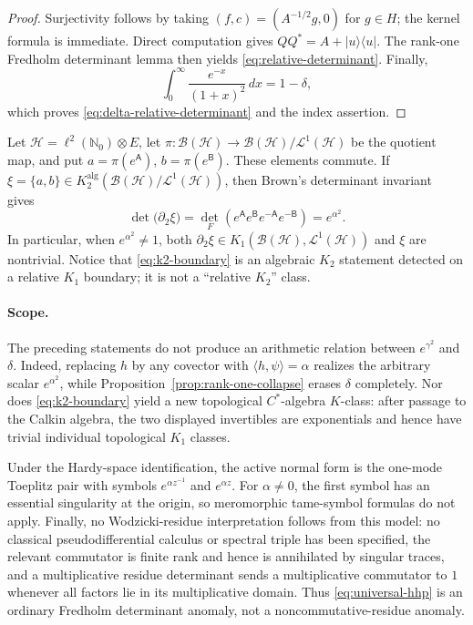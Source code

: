 \documentclass[11pt]{article}
\theoremstyle{definition}
\theoremstyle{remark}
\begin{document}
\begin{proof}
Surjectivity follows by taking $(f,c)=(A^{-1/2}g,0)$ for $g\in H$;
the kernel formula is immediate.  Direct computation gives
$QQ^*=A+|u\rangle\langle u|$.  The rank-one Fredholm determinant lemma
then yields \eqref{eq:relative-determinant}.  Finally,
\[
 \int_0^\infty\frac{e^{-x}}{(1+x)^2}\,dx=1-\delta,
\]
which proves \eqref{eq:delta-relative-determinant} and the index assertion.
\end{proof}

Let $\mathscr H=\ell^2(\mathbb N_0)\otimes E$, let
$\pi:\mathcal B(\mathscr H)\to
\mathcal B(\mathscr H)/\mathcal L^1(\mathscr H)$ be the quotient map, and
put $a=\pi(e^{\mathsf A})$, $b=\pi(e^{\mathsf B})$.  These elements commute.
If $\xi=\{a,b\}\in
K_2^{\mathrm{alg}}(\mathcal B(\mathscr H)/\mathcal L^1(\mathscr H))$, then
Brown's determinant invariant gives~\cite{Migler2017,Kaad2011}
\begin{equation}\label{eq:k2-boundary}
 \det\bigl(\partial_2\xi\bigr)
 =\det_F(e^{\mathsf A}e^{\mathsf B}
          e^{-\mathsf A}e^{-\mathsf B})
 =e^{\alpha^2}.
\end{equation}
In particular, when $e^{\alpha^2}\ne1$, both
$\partial_2\xi\in
K_1(\mathcal B(\mathscr H),\mathcal L^1(\mathscr H))$ and $\xi$ are
nontrivial.  Notice that \eqref{eq:k2-boundary} is an algebraic
$K_2$ statement detected on a relative $K_1$ boundary; it is not a
``relative $K_2$'' class.

\paragraph{Scope.}
The preceding statements do not produce an arithmetic relation between
$e^{\gamma^2}$ and $\delta$.  Indeed, replacing $h$ by any covector with
$\langle h,\psi\rangle=\alpha$ realizes the arbitrary scalar
$e^{\alpha^2}$, while Proposition~\ref{prop:rank-one-collapse} erases
$\delta$ completely.  Nor does \eqref{eq:k2-boundary} yield a new
topological $C^*$-algebra $K$-class: after passage to the Calkin algebra,
the two displayed invertibles are exponentials and hence have trivial
individual topological $K_1$ classes.

Under the Hardy-space identification, the active normal form is the
one-mode Toeplitz pair with symbols $e^{\alpha z^{-1}}$ and $e^{\alpha z}$.
For $\alpha\ne0$, the first symbol has an essential singularity at the
origin, so meromorphic tame-symbol formulas do not apply.  Finally, no
Wodzicki-residue interpretation follows from this model: no classical
pseudodifferential calculus or spectral triple has been specified, the
relevant commutator is finite rank and hence is annihilated by singular
traces, and a multiplicative residue determinant sends a multiplicative
commutator to $1$ whenever all factors lie in its multiplicative domain.
Thus \eqref{eq:universal-hhp} is an ordinary Fredholm
determinant anomaly, not a noncommutative-residue anomaly.
\end{document}
